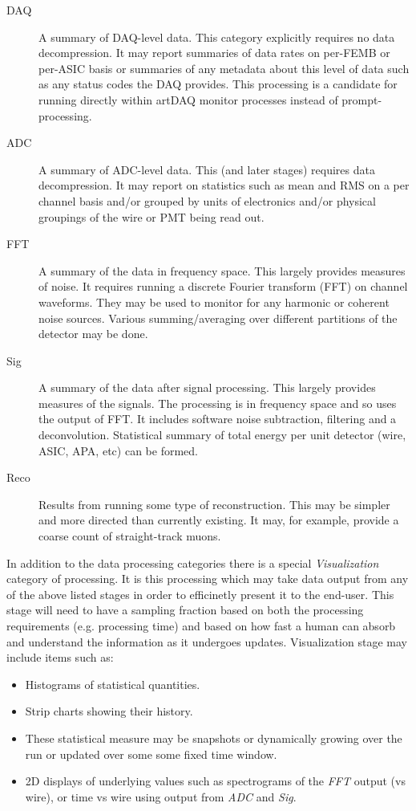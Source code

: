 \documentclass[pdftex,12pt,letter]{article}
\begin{document}
\begin{description}
\item[DAQ] A summary of DAQ-level data.  This category explicitly
  requires no data decompression.  It may report summaries of data
  rates on per-FEMB or per-ASIC basis or summaries of any metadata
  about this level of data such as any status codes the DAQ provides.
  This processing is a candidate for running directly within artDAQ
  monitor processes instead of prompt-processing.
\item[ADC] A summary of ADC-level data.  This (and later stages)
  requires data decompression.  It may report on statistics such as
  mean and RMS on a per channel basis and/or grouped by units of
  electronics and/or physical groupings of the wire or PMT being read
  out.
\item[FFT] A summary of the data in frequency space.  This largely
  provides measures of noise.  It requires running a discrete Fourier
  transform (FFT) on channel waveforms.  They may be used to monitor
  for any harmonic or coherent noise sources.  Various
  summing/averaging over different partitions of the detector may be
  done.
\item[Sig] A summary of the data after signal processing.  This
  largely provides measures of the signals.  The processing is in
  frequency space and so uses the output of FFT.  It includes software
  noise subtraction, filtering and a deconvolution.  Statistical
  summary of total energy per unit detector (wire, ASIC, APA, etc) can
  be formed.
\item[Reco] Results from running some type of reconstruction. This may
  be simpler and more directed than currently existing.  It may, for
  example, provide a coarse count of straight-track muons.
\end{description}

\noindent In addition to the data processing categories there is a special
\textit{Visualization} category of processing.  It is this processing
which may take data output from any of the above listed stages in
order to efficinetly present it to the end-user.  This stage will need to
have a sampling fraction  based on both the processing requirements
(e.g. processing time) and based on how fast a human can absorb and understand
the information as it undergoes updates.  Visualization stage may include items such as:

\begin{itemize}
\item Histograms of statistical quantities.
\item Strip charts showing their history.
\item These statistical measure may be snapshots or dynamically
  growing over the run or updated over some some fixed time window.
\item 2D displays of underlying values such as spectrograms of the \textit{FFT}
  output (vs wire), or time vs wire using output from \textit{ADC} and \textit{Sig}.
\end{itemize}
\end{document}
